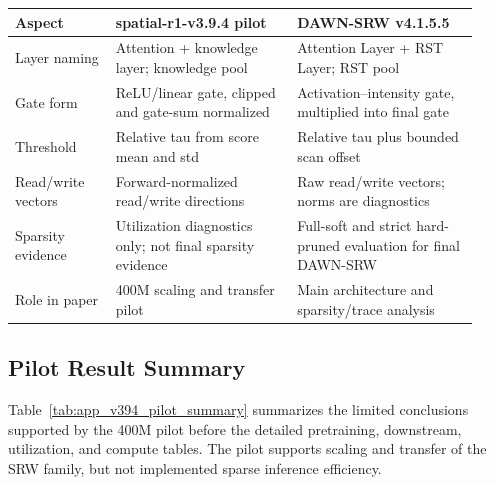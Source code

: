 \documentclass{article}
\begin{document}
\begin{center}
\small
\setlength{\tabcolsep}{3pt}
\renewcommand{\arraystretch}{1.12}
\begin{tabular}{p{0.20\linewidth}p{0.36\linewidth}p{0.36\linewidth}}
\toprule
Aspect & spatial-r1-v3.9.4 pilot & DAWN-SRW v4.1.5.5 \\ 
\midrule
Layer naming & Attention + knowledge layer; knowledge pool & Attention Layer + RST Layer; RST pool \\ 
Gate form & ReLU/linear gate, clipped and gate-sum normalized & Activation--intensity gate, multiplied into final gate \\ 
Threshold & Relative tau from score mean and std & Relative tau plus bounded scan offset \\ 
Read/write vectors & Forward-normalized read/write directions & Raw read/write vectors; norms are diagnostics \\ 
Sparsity evidence & Utilization diagnostics only; not final sparsity evidence & Full-soft and strict hard-pruned evaluation for final DAWN-SRW \\ 
Role in paper & 400M scaling and transfer pilot & Main architecture and sparsity/trace analysis \\ 
\bottomrule
\end{tabular}
\label{tab:app_v394_v4155_diff}
\end{center}

\subsection{Pilot Result Summary}

Table~\ref{tab:app_v394_pilot_summary} summarizes the limited conclusions supported by the 400M pilot before the detailed pretraining, downstream, utilization, and compute tables. The pilot supports scaling and transfer of the SRW family, but not implemented sparse inference efficiency.
\end{document}
